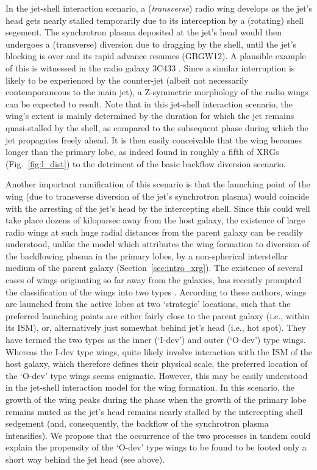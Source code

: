 \documentclass[twocolumn]{aastex62}
\begin{document}
In the jet-shell interaction scenario, a ({\it transverse}) radio wing
develops as the jet's head gets nearly stalled temporarily due to its
interception by a (rotating) shell segement. The synchrotron plasma
deposited at the jet's head would then undergoes a (transverse)
diversion due to dragging by the shell, until the jet's blocking is
over and its rapid advance resumes (GBGW12). A plausible example of
this is witnessed in the radio galaxy 3C433 \citep[][see Fig. 1 of
  GBGW12]{Miller2009ApJ...695..755M}. Since a similar interruption is
likely to be experienced by the counter-jet (albeit not necessarily
contemporaneous to the main jet), a Z-symmetric morphology of the
radio wings can be expected to result. Note that in this jet-shell
interaction scenario, the wing's extent is mainly determined by the
duration for which the jet remains quasi-stalled by the shell, as
compared to the subsequent phase during which the jet propagates
freely ahead. It is then easily conceivable that the wing becomes
longer than the primary lobe, as indeed found in roughly a fifth of
XRGs (Fig.~\ref{fig:l_dist}) to the detriment of the basic backflow
diversion scenario. 

Another important ramification of this scenario is
that the launching point of the wing (due to transverse diversion of
the jet's synchrotron plasma) would coincide with the arresting of
the jet's head by the intercepting shell. Since this could well take
place dozens of kiloparsec away from the host galaxy, the existence of
large radio wings at such huge radial distances from the parent galaxy
can be readily understood, unlike the model which attributes the wing
formation to diversion of the backflowing plasma in the primary lobes,
by a non-spherical interstellar medium of the parent galaxy
(Section~\ref{sec:intro_xrg}). The existence of several cases of wings
originating so far away from the galaxies, has recently prompted the
classification of the wings into two types
\citep{Saripalli2018ApJ...852...48S}. According to these authors,
wings are launched from the active lobes at two `strategic' locations,
such that the preferred launching points are either fairly close to
the parent galaxy (i.e., within its ISM), or, alternatively just
somewhat behind jet's head (i.e., hot spot). They have termed the two
types as the inner (`I-dev') and outer (`O-dev') type wings. Whereas
the I-dev type wings, quite likely involve interaction with the ISM of
the host galaxy, which therefore defines their physical scale, the
preferred location of the `O-dev' type wings seems enigmatic. However,
this may be easily understood in the jet-shell interaction model for
the wing formation.
In this scenario, the growth of the wing peaks during the phase when the 
growth of the primary lobe remains muted as the jet's head remains nearly 
stalled by the intercepting shell sedgement (and, consequently, the backflow
of the synchrotron plasma intensifies). We propose that the occurrence of 
the two processes in tandem could explain the propensity of the `O-dev' 
type wings  to be found to be footed only a short way behind the jet head (see  above). 
\end{document}
